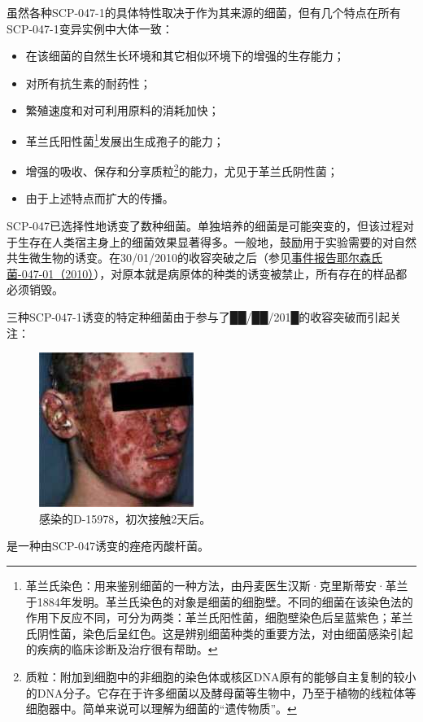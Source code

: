 虽然各种SCP-047-1的具体特性取决于作为其来源的细菌，但有几个特点在所有SCP-047-1变异实例中大体一致：

\begin{itemize}
\item 在该细菌的自然生长环境和其它相似环境下的增强的生存能力；
\item 对所有抗生素的耐药性；
\item 繁殖速度和对可利用原料的消耗加快；
\item 革兰氏阳性菌\footnote{革兰氏染色：用来鉴别细菌的一种方法，由丹麦医生汉斯·克里斯蒂安·革兰于1884年发明。革兰氏染色的对象是细菌的细胞壁。不同的细菌在该染色法的作用下反应不同，可分为两类：革兰氏阳性菌，细胞壁染色后呈蓝紫色；革兰氏阴性菌，染色后呈红色。这是辨别细菌种类的重要方法，对由细菌感染引起的疾病的临床诊断及治疗很有帮助。}发展出生成孢子的能力；
\item 增强的吸收、保存和分享质粒\footnote{质粒：附加到细胞中的非细胞的染色体或核区DNA原有的能够自主复制的较小的DNA分子。它存在于许多细菌以及酵母菌等生物中，乃至于植物的线粒体等细胞器中。简单来说可以理解为细菌的“遗传物质”。}的能力，尤见于革兰氏阴性菌；
\item 由于上述特点而扩大的传播。
\end{itemize}

SCP-047已选择性地诱变了数种细菌。单独培养的细菌是可能突变的，但该过程对于生存在人类宿主身上的细菌效果显著得多。一般地，鼓励用于实验需要的对自然共生微生物的诱变。在30\slash 01\slash 2010的收容突破之后（参见\hyperref[chap:]{事件报告耶尔森氏菌-047-01（2010）}），对原本就是病原体的种类的诱变被禁止，所有存在的样品都必须销毁。

三种SCP-047-1诱变的特定种细菌由于参与了██\slash ██\slash 201█的收容突破而引起关注：



\begin{figure}[H]
    \centering
    \includegraphics[width=0.2\linewidth]{images/SCP-047-2.jpg}
    \caption*{感染的D-15978，初次接触2天后。}
\end{figure}

是一种由SCP-047诱变的痤疮丙酸杆菌。

